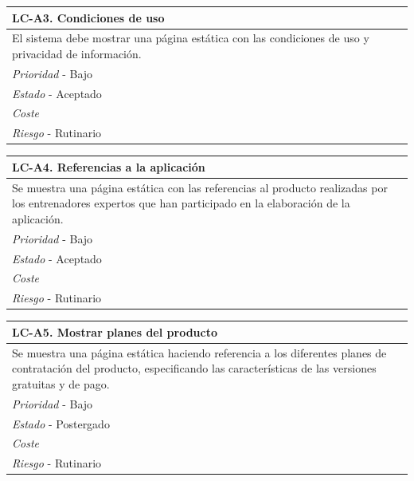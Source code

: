 	\begin{center}
		\begin{tabularx}{15cm}{|X|}
			\hline 
				\bf{LC-A3. Condiciones de uso}\\
			\hline
				El sistema debe mostrar una página estática con las condiciones de uso y privacidad de información.\\
			\hline
				{\it Prioridad} - Bajo\\
			\hline
				{\it Estado} - Aceptado\\
			\hline
				{\it Coste}\\
			\hline
				{\it Riesgo} - Rutinario\\
			\hline
		\end{tabularx}
	\end{center}
	
	\begin{center}
		\begin{tabularx}{15cm}{|X|}
			\hline 
				\bf{LC-A4. Referencias a la aplicación}\\
			\hline
				Se muestra una página estática con las referencias al producto realizadas por los entrenadores expertos que han participado en la elaboración de la aplicación.\\
			\hline
				{\it Prioridad} - Bajo\\
			\hline
				{\it Estado} - Aceptado\\
			\hline
				{\it Coste}\\
			\hline
				{\it Riesgo} - Rutinario\\
			\hline
		\end{tabularx}
	\end{center}
	
	\begin{center}
		\begin{tabularx}{15cm}{|X|}
			\hline 
				\bf{LC-A5. Mostrar planes del producto}\\
			\hline
				Se muestra una página estática haciendo referencia a los diferentes planes de contratación del producto, especificando las características de las versiones gratuitas y de pago.\\
			\hline
				{\it Prioridad} - Bajo\\
			\hline
				{\it Estado} - Postergado\\
			\hline
				{\it Coste}\\
			\hline
				{\it Riesgo} - Rutinario\\
			\hline
		\end{tabularx}
	\end{center}		

